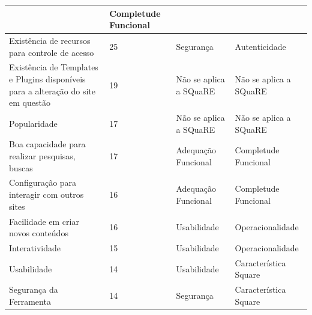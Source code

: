 \begin{apendicesenv}
\begin{longtable}{|p{175pt}|p{18pt}|p{110pt}|p{120pt}|}
  	 	 & {\raggedright {Completude Funcional}}\\
  	 	\hline
 {\raggedright {Existência de recursos para controle de acesso}}
  	 	 & {\raggedright {25}}
  	 	 & {\raggedright {Segurança}}
  	 	 & {\raggedright {Autenticidade}}\\
  	 	\hline
  	{\raggedright {Existência de Templates e Plugins disponíveis para a alteração do site em questão}}
  	 	  	  & {\raggedright {19}}
  	 	  	 & {\raggedright {Não se aplica a SQuaRE}}
  	 	  	 & {\raggedright {Não se aplica a SQuaRE}}\\
  	 	  	 	\hline
  	 	  	 	
 {\raggedright {Popularidade}}
  	 	 & {\raggedright {17}}
  	 	 & {\raggedright {Não se aplica a SQuaRE}}
  	 	 & {\raggedright {Não se aplica a SQuaRE}}\\
  	 	\hline
 
 {\raggedright {Boa capacidade para realizar pesquisas, buscas}}
  	 	 & {\raggedright {17}}
  	 	 & {\raggedright {Adequação Funcional}}
  	 	 & {\raggedright {Completude Funcional}}\\
  	 	\hline
  	 	 
 {\raggedright {Configuração para interagir com outros sites}}
  	 	 & {\raggedright {16}}
  	 	 & {\raggedright {Adequação Funcional}}
  	 	 & {\raggedright {Completude Funcional}}\\
  	 	\hline
{\raggedright {Facilidade em criar novos conteúdos}}
  	 	 & {\raggedright {16}}
  	 	 & {\raggedright {Usabilidade}}
  	 	 & {\raggedright {Operacionalidade}}\\
  	 	\hline
  	 	
 {\raggedright {Interatividade}}
  	 	 & {\raggedright {15}}
  	 	 & {\raggedright {Usabilidade}}
  	 	 & {\raggedright {Operacionalidade}}\\
  	 	\hline
 {\raggedright {Usabilidade}}
   	 	 & {\raggedright {14}}
   	 	 & {\raggedright {Usabilidade}}
   	 	 & {\raggedright {Característica Square}}\\
   	 	\hline
  {\raggedright {Segurança da Ferramenta}}
   	 	 & {\raggedright {14}}
   	 	 & {\raggedright {Segurança}}
   	 	 & {\raggedright {Característica Square}}\\
   	 	\hline
 

\end{longtable}
\end{apendicesenv}
